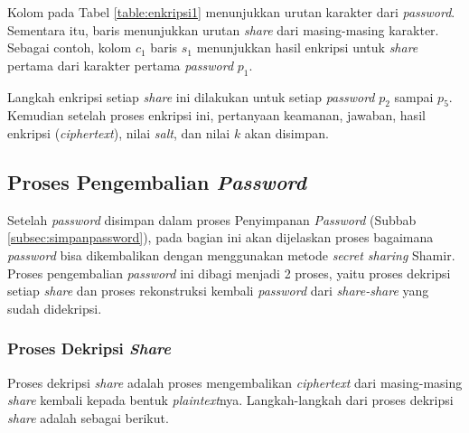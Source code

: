 Kolom pada Tabel \ref{table:enkripsi1} menunjukkan urutan karakter dari \textit{password}. Sementara itu, baris menunjukkan urutan \textit{share} dari masing-masing karakter. Sebagai contoh, kolom $c_1$ baris $s_1$ menunjukkan hasil enkripsi untuk \textit{share} pertama dari karakter pertama \textit{password} $p_1$.

Langkah enkripsi setiap \textit{share} ini dilakukan untuk setiap \textit{password} \begin{math}p_2\end{math} sampai \begin{math}p_5\end{math}. Kemudian setelah proses enkripsi ini, pertanyaan keamanan, jawaban, hasil enkripsi (\textit{ciphertext}), nilai \textit{salt}, dan nilai \begin{math}k\end{math} akan disimpan.

\subsection{Proses Pengembalian \textit{Password}}

Setelah \textit{password} disimpan dalam proses Penyimpanan \textit{Password} (Subbab \ref{subsec:simpanpassword}), pada bagian ini akan dijelaskan proses bagaimana \textit{password} bisa dikembalikan dengan menggunakan metode \textit{secret sharing} Shamir. Proses pengembalian \textit{password} ini dibagi menjadi 2 proses, yaitu proses dekripsi setiap \textit{share} dan proses rekonstruksi kembali \textit{password} dari \textit{share-share} yang sudah didekripsi.

\subsubsection{Proses Dekripsi \textit{Share}}

Proses dekripsi \textit{share} adalah proses mengembalikan \textit{ciphertext} dari masing-masing \textit{share} kembali kepada bentuk \textit{plaintext}nya. Langkah-langkah dari proses dekripsi \textit{share} adalah sebagai berikut.

